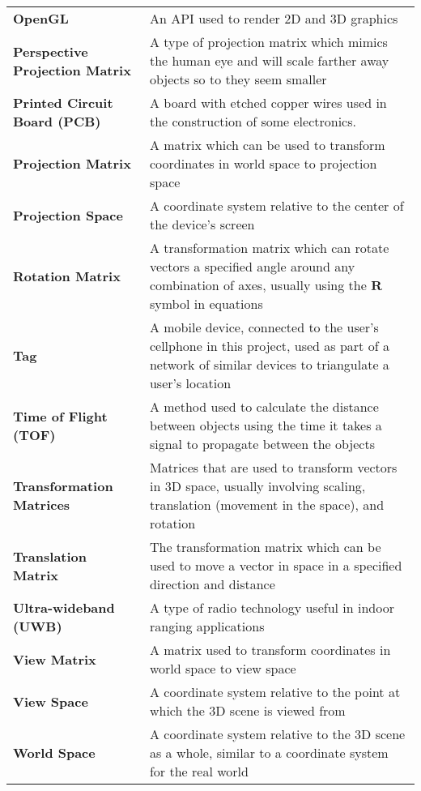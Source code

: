 \documentclass[
11pt, %
oneside, %
english, %
onehalfspacing, %
nolistspacing, %
hidelinks, %
headsepline, %
consistentlayout, %
table, %
]{MastersDoctoralThesis} %
\begin{document}
\begin{longtable}{p{6cm} p{7cm}}
\textbf{OpenGL} & An API used to render 2D and 3D graphics\\
\textbf{Perspective Projection Matrix} & A type of projection matrix which mimics the human eye and will scale farther away objects so to they seem smaller\\
\textbf{Printed Circuit Board (PCB)} & A board with etched copper wires used in the construction of some electronics. \\
\textbf{Projection Matrix} & A matrix which can be used to transform coordinates in world space to projection space\\
\textbf{Projection Space} & A coordinate system relative to the center of the device's screen\\
\textbf{Rotation Matrix} & A transformation matrix which can rotate vectors a specified angle around any combination of axes, usually using the $\mathbf{R}$ symbol in equations\\
\textbf{Tag} & A mobile device, connected to the user's cellphone in this project, used as part of a network of similar devices to triangulate a user's location\\
\textbf{Time of Flight (TOF)} & A method used to calculate the distance between objects using the time it takes a signal to propagate between the objects\\
\textbf{Transformation Matrices} & Matrices that are used to transform vectors in 3D space, usually involving scaling, translation (movement in the space), and rotation\\
\textbf{Translation Matrix} & The transformation matrix which can be used to move a vector in space in a specified direction and distance\\
\textbf{Ultra-wideband (UWB)} & A type of radio technology useful in indoor ranging applications\\
\textbf{View Matrix} & A matrix used to transform coordinates in world space to view space\\
\textbf{View Space} & A coordinate system relative to the point at which the 3D scene is viewed from\\
\textbf{World Space} & A coordinate system relative to the 3D scene as a whole, similar to a coordinate system for the real world\\
\end{longtable}


\end{document}
